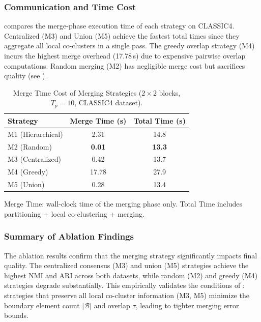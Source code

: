 \documentclass[journal]{IEEEtran}
\theoremstyle{definition}
\theoremstyle{remark} %
\begin{document}
{\subsubsection{Communication and Time Cost}

 compares the merge-phase execution time of each strategy on CLASSIC4. Centralized (M3) and Union (M5) achieve the fastest total times since they aggregate all local co-clusters in a single pass. The greedy overlap strategy (M4) incurs the highest merge overhead (17.78\,s) due to expensive pairwise overlap computations. Random merging (M2) has negligible merge cost but sacrifices quality (see ).

\begin{table}[htbp]
    \centering
    \caption{Merge Time Cost of Merging Strategies ($2\times2$ blocks, $T_p=10$, CLASSIC4 dataset).}
    \label{tab:merging-cost}
    \begin{threeparttable}
        \begin{tabular}{@{} l cc @{}}
            \toprule
            Strategy & Merge Time (s) & Total Time (s) \\
            \midrule
            M1 (Hierarchical) & 2.31           & 14.8           \\
            M2 (Random)       & \textbf{0.01}  & \textbf{13.3}  \\
            M3 (Centralized)  & 0.42           & 13.7           \\
            M4 (Greedy)       & 17.78          & 27.9           \\
            M5 (Union)        & 0.28           & 13.4           \\
            \bottomrule
        \end{tabular}
        \begin{tablenotes}
            \small
            \item Merge Time: wall-clock time of the merging phase only. Total Time includes partitioning + local co-clustering + merging.
        \end{tablenotes}
    \end{threeparttable}
\end{table}

\subsubsection{Summary of Ablation Findings}

The ablation results confirm that the merging strategy significantly impacts final quality. The centralized consensus (M3) and union (M5) strategies achieve the highest NMI and ARI across both datasets, while random (M2) and greedy (M4) strategies degrade substantially. This empirically validates the conditions of : strategies that preserve all local co-cluster information (M3, M5) minimize the boundary element count $|\mathcal{B}|$ and overlap $\tau$, leading to tighter merging error bounds.
}
\end{document}

